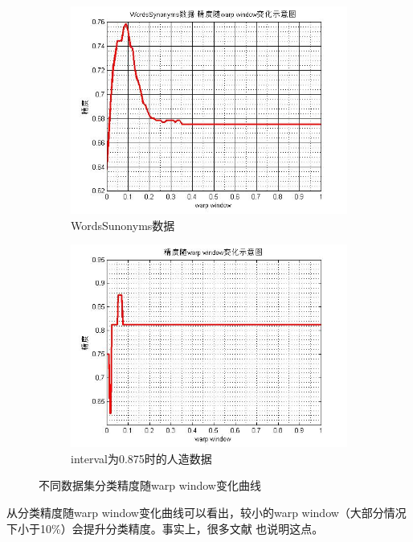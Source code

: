 \begin{figure}[h]
    \begin{subfigure}[t]{0.4\linewidth}
        \includegraphics[width=\linewidth]{./figure/WordsSunonyms.jpg}
        \caption{WordsSunonyms数据} \label{fig:subfigure:3}
    \end{subfigure}
    \quad
    \begin{subfigure}[t]{0.4\linewidth}
        \includegraphics[width=\linewidth]{./figure/accuracy_warp_window.jpg}
        \caption{interval为0.875时的人造数据} \label{fig:subfigure:4}
    \end{subfigure}
    \caption{不同数据集分类精度随warp window变化曲线}
    \label{fig:13}
\end{figure}
从分类精度随warp window变化曲线可以看出，较小的warp window（大部分情况下小于10\%）会提升分类精度。事实上，很多文献\cite{UCR_data} \cite{Ratanamahatana2005} 也说明这点。

